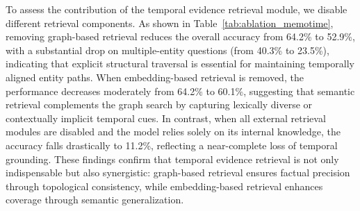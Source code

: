 \begin{table}[t]
\centering
\caption{Ablation study on \textbf{MultiTQ} (Hits@1, \%).}
\vspace{-2mm}
\label{tab:ablation_memotime}
\end{table}


To assess the contribution of the temporal evidence retrieval module, we disable different retrieval components.
As shown in Table~\ref{tab:ablation_memotime}, removing graph-based retrieval reduces the overall accuracy from 64.2\% to 52.9\%, with a substantial drop on multiple-entity questions (from 40.3\% to 23.5\%), indicating that explicit structural traversal is essential for maintaining temporally aligned entity paths.
When embedding-based retrieval is removed, the performance decreases moderately from 64.2\% to 60.1\%, suggesting that semantic retrieval complements the graph search by capturing lexically diverse or contextually implicit temporal cues.
In contrast, when all external retrieval modules are disabled and the model relies solely on its internal knowledge, the accuracy falls drastically to 11.2\%, reflecting a near-complete loss of temporal grounding.
These findings confirm that temporal evidence retrieval is not only indispensable but also synergistic: graph-based retrieval ensures factual precision through topological consistency, while embedding-based retrieval enhances coverage through semantic generalization.






